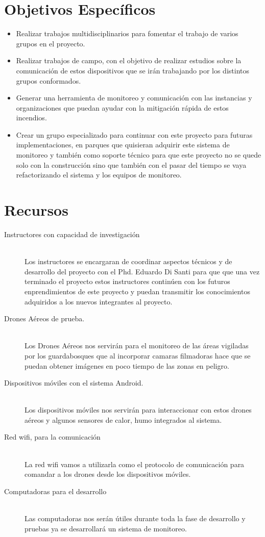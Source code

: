 \documentclass[letter,12pt]{article}
\begin{document}
\section{Objetivos Espec\'ificos}
\begin{itemize}
\item Realizar trabajos multidisciplinarios para fomentar el trabajo de varios grupos en el proyecto.
\item Realizar trabajos de campo, con el objetivo de realizar estudios sobre la comunicación de estos dispositivos que se irán trabajando por los distintos grupos conformados.
\item Generar una herramienta de monitoreo y comunicación con las instancias y organizaciones que puedan ayudar con la mitigación rápida de estos incendios.
\item Crear un grupo especializado para continuar con este proyecto para futuras implementaciones, en parques que quisieran adquirir este sistema de monitoreo y también como soporte técnico para que este proyecto no se quede solo con la construcción sino que también con el pasar del tiempo se vaya refactorizando el sistema y los equipos de monitoreo.
\end{itemize}


\section{Recursos}
\begin{description}
\item[Instructores con capacidad de investigación]~\\
Los instructores se encargaran de coordinar aspectos técnicos y de desarrollo del proyecto con el Phd. Eduardo Di Santi para que que una vez terminado el proyecto estos instructores continúen con los futuros enprendimientos de este proyecto y puedan transmitir los conocimientos adquiridos a los nuevos integrantes al proyecto.
\item[Drones Aéreos de prueba.]~\\
Los Drones Aéreos nos servirán para el monitoreo de las áreas vigiladas por los guardabosques que al incorporar camaras filmadoras hace que se puedan obtener imágenes en poco tiempo de las zonas en peligro. 
\item[Dispositivos móviles con el sistema Android.]~\\
Los dispositivos móviles nos servirán para interaccionar con estos drones aéreos y algunos sensores de calor, humo integrados al sistema.
\item[Red wifi, para la comunicación]~\\
La red wifi vamos a utilizarla como el protocolo de comunicación para comandar a los drones desde los dispositivos móviles.
\item[Computadoras para el desarrollo]~\\
Las computadoras nos serán útiles durante toda la fase de desarrollo y pruebas ya se desarrollará un sistema de monitoreo.
\end{description}
\end{document}
